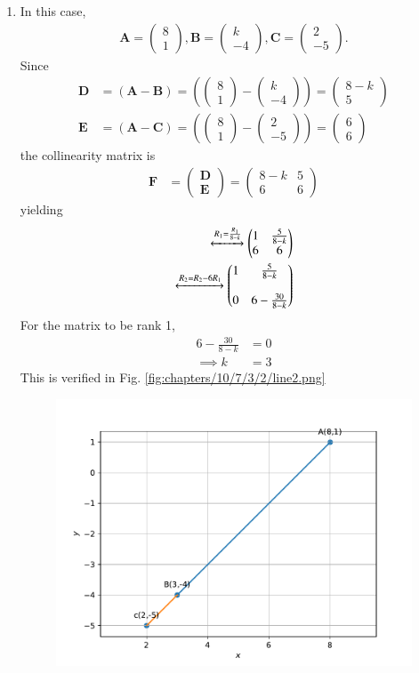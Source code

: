 \documentclass[journal,10pt,twocolumn]{article}
\newcommand{\myvec}[1]{\ensuremath{\begin{pmatrix}#1\end{pmatrix}}}
\let\vec\mathbf
\providecommand{\brak}[1]{\ensuremath{\left(#1\right)}}
\let\vec\mathbf
\begin{document}
\begin{enumerate}
\begin{figure}[h!]
	  \caption{}
	  \label{fig:chapters/10/7/3/2/line1.pdf}
	  \end{figure} 	 		  
%
 \item In this case,
\begin{align}  
\vec{A}=\myvec{8 \\ 1},
\vec{B}=\myvec{k \\ -4},
\vec{C}=\myvec{2 \\ -5}.
\end{align}
Since
\begin{align}  
 \vec{D} &=\brak{\vec{A}-\vec{B}} = \brak{\myvec{8 \\1 } - \myvec{k \\-4 } } = \myvec{8-k \\ 5 }\\
\vec{E} &= \brak{\vec{A}-\vec{C}} = \brak{\myvec{8 \\ 1 } - \myvec{2 \\-5 } } = \myvec{6 \\6}
\end{align}
the collinearity matrix is
\begin{align}
\vec{F} &={\myvec{\vec{D}\\ \vec{E}}}
=
\myvec{
8-k & 5
 \\
6 & 6
}
\end{align}
yielding
\begin{align}
\label{eq:chapters/10/7/3/2/chem_balance_mat_row}
 \xleftrightarrow[]{R_1=\frac{R_1}{8-k}}
\myvec{
1& \frac{5}{8-k}
\\
6 & 6
}
\\
\xleftrightarrow[]{R_2 = R_2-6R_1}
\myvec{
1 & \frac{5}{8-k}
\\
\\
0 & 6-\frac{30}{8-k}
}
\end{align}
For 
the matrix to be rank 1,
\begin{align}
6-\frac{30}{8-k}&=0
\\
\implies k &=3
\end{align}
This is verified in Fig. 
	  \ref{fig:chapters/10/7/3/2/line2.png}
\begin{figure}[h]
	  \centering 
	  \includegraphics[width=\columnwidth]{chapters/10/7/3/2/figs/line2.pdf}

\end{figure}
\end{enumerate}
\end{document}
